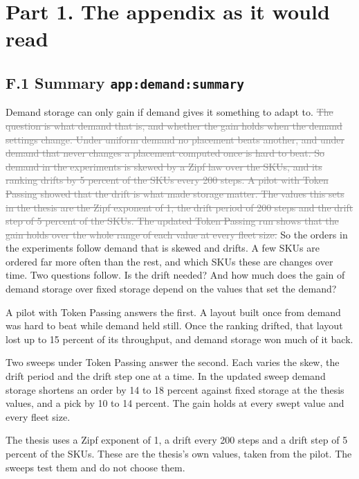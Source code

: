 \documentclass[11pt,a4paper]{article}
\newcommand{\new}[1]{\textcolor{newc}{#1}}
\newcommand{\old}[1]{\textcolor{gray}{\sout{#1}}}
\newenvironment{greenblock}{\color{newc}}{}
\newcommand{\lref}[1]{{\small\texttt{#1}}}
\begin{document}
\section*{Part 1. The appendix as it would read}

\subsection*{F.1 Summary \hfill\lref{app:demand:summary}}

Demand storage can only gain if demand gives it something to adapt to.
\old{The question is what demand that is, and whether the gain holds when
the demand settings change. Under uniform demand no placement beats another,
and under demand that never changes a placement computed once is hard to
beat. So demand in the experiments is skewed by a Zipf law over the SKUs, and
its ranking drifts by 5 percent of the SKUs every 200 steps. A pilot with
Token Passing showed that the drift is what made storage matter. The values
this sets in the thesis are the Zipf exponent of 1, the drift period of 200
steps and the drift step of 5 percent of the SKUs. The updated Token Passing
run shows that the gain holds over the whole range of each value at every
fleet size.}
\new{So the orders in the experiments follow demand that is skewed and
drifts. A few SKUs are ordered far more often than the rest, and which SKUs
these are changes over time. Two questions follow. Is the drift needed? And
how much does the gain of demand storage over fixed storage depend on the
values that set the demand?}

\begin{greenblock}
A pilot with Token Passing answers the first. A layout built once from
demand was hard to beat while demand held still. Once the ranking drifted,
that layout lost up to 15 percent of its throughput, and demand storage won
much of it back.

Two sweeps under Token Passing answer the second. Each varies the skew, the
drift period and the drift step one at a time. In the updated sweep demand
storage shortens an order by 14 to 18 percent against fixed storage at the
thesis values, and a pick by 10 to 14 percent. The gain holds at every swept
value and every fleet size.

The thesis uses a Zipf exponent of 1, a drift every 200 steps and a drift
step of 5 percent of the SKUs. These are the thesis's own values, taken from
the pilot. The sweeps test them and do not choose them.
\end{greenblock}
\end{document}
